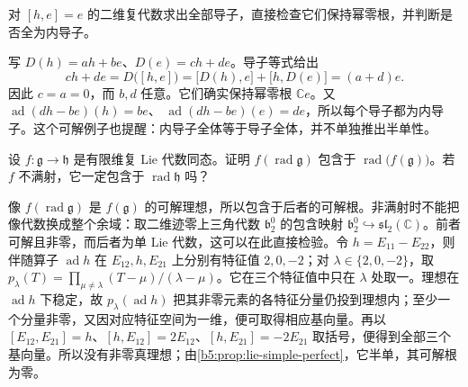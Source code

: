 \begin{exercise}\label{b5:ex:12-derivation-affine}
	对 \([h,e]=e\) 的二维复代数求出全部导子，直接检查它们保持幂零根，并判断是否全为内导子。
\end{exercise}
\begin{solution}
	写 \(D(h)=ah+be\)、\(D(e)=ch+de\)。导子等式给出
	\[
		ch+de=D\bigl([h,e]\bigr)=\bigl[D(h),e\bigr]+\bigl[h,D(e)\bigr]=(a+d)e.
	\]
	因此 \(c=a=0\)，而 \(b,d\) 任意。它们确实保持幂零根 \(\mathbb Ce\)。又 \(\operatorname{ad}(dh-be)(h)=be\)、 \(\operatorname{ad}(dh-be)(e)=de\)，所以每个导子都为内导子。这个可解例子也提醒：内导子全体等于导子全体，并不单独推出半单性。
\end{solution}

\begin{exercise}\label{b5:ex:12-radical-homomorphisms}
	设 \(f:\mathfrak g\rightarrow\mathfrak h\) 是有限维复 Lie 代数同态。证明 \(f(\operatorname{rad}\mathfrak g)\) 包含于 \(\operatorname{rad}\bigl(f(\mathfrak g)\bigr)\)。若 \(f\) 不满射，它一定包含于 \(\operatorname{rad}\mathfrak h\) 吗？
\end{exercise}
\begin{solution}
	像 \(f(\operatorname{rad}\mathfrak g)\) 是 \(f(\mathfrak g)\) 的可解理想，所以包含于后者的可解根。非满射时不能把像代数换成整个余域：取二维迹零上三角代数 \(\mathfrak b_2^0\) 的包含映射 \(\mathfrak b_2^0\hookrightarrow\mathfrak{sl}_2(\mathbb C)\)。前者可解且非零，而后者为单 Lie 代数，这可以在此直接检验。令 \(h=E_{11}-E_{22}\)，则伴随算子 \(\operatorname{ad}h\) 在 \(E_{12},h,E_{21}\) 上分别有特征值 \(2,0,-2\)；对 \(\lambda\in\{2,0,-2\}\)，取 \(p_\lambda(T)=\prod_{\mu\ne\lambda}(T-\mu)/(\lambda-\mu)\)。它在三个特征值中只在 \(\lambda\) 处取一。理想在 \(\operatorname{ad}h\) 下稳定，故 \(p_\lambda(\operatorname{ad}h)\) 把其非零元素的各特征分量仍投到理想内；至少一个分量非零，又因对应特征空间为一维，便可取得相应基向量。再以 \([E_{12},E_{21}]=h\)、\([h,E_{12}]=2E_{12}\)、\([h,E_{21}]=-2E_{21}\) 取括号，便得到全部三个基向量。所以没有非零真理想；由\cref{b5:prop:lie-simple-perfect}，它半单，其可解根为零。
\end{solution}

